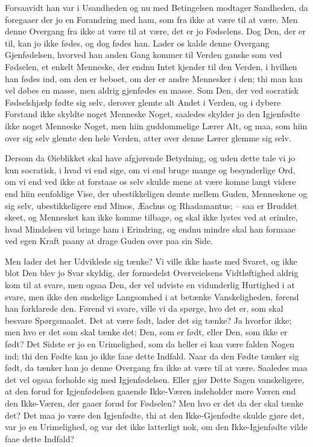 \documentclass[12pt,a4paper]{article}
\begin{document}
Forsaavidt han var i Usandheden og nu med Betingelsen modtager Sandheden, da foregaaer der jo en Forandring med ham, som fra ikke at være til at være. Men denne Overgang fra ikke at være til at være, det er jo Fødselens. Dog Den, der er til, kan jo ikke fødes, og dog fødes han. Lader os kalde denne Overgang Gjenfødelsen, hvorved han anden Gang kommer til Verden ganske som ved Fødselen, et enkelt Menneske, der endnu Intet kjender til den Verden, i hvilken han fødes ind, om den er beboet, om der er andre Mennesker i den; thi man kan vel døbes en masse, men aldrig gjenfødes en masse. Som Den, der ved socratisk Fødselshjælp fødte sig selv, derover glemte alt Andet i Verden, og i dybere Forstand ikke skyldte noget Menneske Noget, saaledes skylder jo den Igjenfødte ikke noget Menneske Noget, men hiin guddommelige Lærer Alt, og maa, som hiin over sig selv glemte den hele Verden, atter over denne Lærer glemme sig selv.

Dersom da Øieblikket skal have afgjørende Betydning, og uden dette tale vi jo kun socratisk, i hvad vi end sige, om vi end bruge mange og besynderlige Ord, om vi end ved ikke at forstaae os selv skulde mene at være komne langt videre end hiin eenfoldige Vise, der ubestikkeligen dømte mellem Guden, Menneskene og sig selv, ubestikkeligere end Minos, Æachus og Rhadamantus; – saa er Bruddet skeet, og Mennesket kan ikke komme tilbage, og skal ikke lystes ved at erindre, hvad Mindelsen vil bringe ham i Erindring, og endnu mindre skal han formaae ved egen Kraft paany at drage Guden over paa sin Side.

Men lader det her Udviklede sig tænke? Vi ville ikke haste med Svaret, og ikke blot Den blev jo Svar skyldig, der formedelst Overveielsens Vidtløftighed aldrig kom til at svare, men ogsaa Den, der vel udviste en vidunderlig Hurtighed i at svare, men ikke den ønskelige Langsomhed i at betænke Vanskeligheden, førend han forklarede den. Førend vi svare, ville vi da spørge, hvo det er, som skal besvare Spørgsmaalet. Det at være født, lader det sig tænke? Ja hvorfor ikke; men hvo er det som skal tænke det; Den, som er født, eller Den, som ikke er født? Det Sidste er jo en Urimelighed, som da heller ei kan være falden Nogen ind; thi den Fødte kan jo ikke faae dette Indfald. Naar da den Fødte tænker sig født, da tænker han jo denne Overgang fra ikke at være til at være. Saaledes maa det vel ogsaa forholde sig med Igjenfødelsen. Eller gjør Dette Sagen vanskeligere, at den forud for Igjenfødelsen gaaende Ikke-Væren indeholder mere Væren end den Ikke-Væren, der gaaer forud for Fødselen? Men hvo er det da der skal tænke det? Det maa jo være den Igjenfødte, thi at den Ikke-Gjenfødte skulde gjøre det, var jo en Urimelighed, og var det ikke latterligt nok, om den Ikke-Igjenfødte vilde faae dette Indfald?
\end{document}
